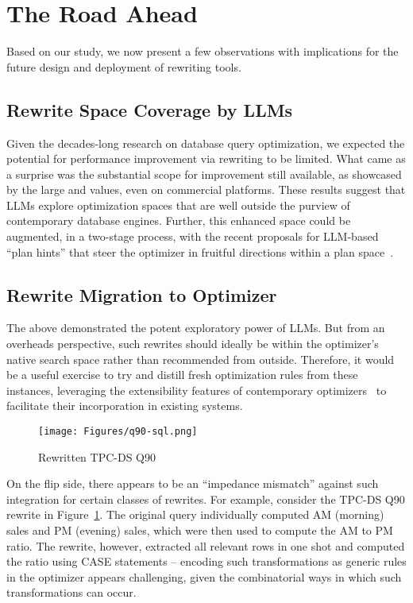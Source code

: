 \section{The Road Ahead}
\label{sec:ll}

Based on our study, we now present a few observations with implications for the future design and deployment of rewriting tools.

\subsection{Rewrite Space Coverage by LLMs}

Given the decades-long research on database query optimization, we expected the potential for performance improvement via rewriting to be limited. What came as a surprise was the substantial scope for improvement still available, as showcased by the large \csgm and \tsgm values, even on commercial platforms. These results suggest that LLMs explore optimization spaces that are well outside the purview of contemporary database engines. Further, this enhanced space could be augmented, in a two-stage process, with the recent proposals for LLM-based ``plan hints'' that steer the optimizer in fruitful directions within a plan space~\cite{LLMplanhint}.

\subsection{Rewrite Migration to Optimizer}
The above demonstrated the potent exploratory power of LLMs. But from an overheads perspective, such rewrites should ideally be within the optimizer's native search space rather than recommended from outside. Therefore, it would be a useful exercise to try and distill fresh optimization rules from these instances, leveraging the extensibility features of contemporary optimizers~\cite{extoptbook} to facilitate their incorporation in existing systems.

\begin{figure}[t]
    \centering
    \texttt{[image: Figures/q90-sql.png]}
    \vspace{-0.1in}
    \caption{Rewritten TPC-DS Q90}
    \label{fig:q90-rewrite}
    \vspace{-0.1in}
\end{figure}

On the flip side, there appears to be an ``impedance mismatch'' against such integration for certain classes of rewrites. 
%
For example, consider the TPC-DS Q90 rewrite in Figure~\ref{fig:q90-rewrite}. 
The original query individually computed  AM (morning) sales and PM (evening) sales, which were then used to compute the AM to PM ratio. The rewrite, however, 
extracted all relevant rows in one shot and computed the ratio using CASE statements -- encoding such transformations as generic rules in the optimizer appears challenging, given the combinatorial ways in which such transformations can occur.

